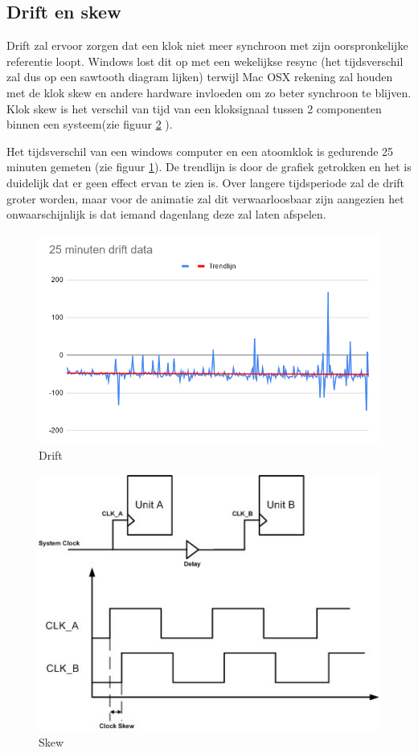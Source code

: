 \subsection{Drift en skew}

Drift zal ervoor zorgen dat een klok niet meer synchroon met zijn oorspronkelijke referentie loopt. Windows lost dit op met een wekelijkse resync (het tijdsverschil zal dus op een sawtooth diagram lijken) terwijl Mac OSX rekening zal houden met de klok skew en andere hardware invloeden om zo beter synchroon te blijven.
Klok skew is het verschil van tijd van een kloksignaal tussen 2 componenten binnen een systeem(zie figuur \ref{skew1} \cite{skew}).

Het tijdsverschil van een windows computer en een atoomklok is gedurende 25 minuten gemeten (zie figuur \ref{drift}). De trendlijn is door de grafiek getrokken en het is duidelijk dat er geen effect ervan te zien is. Over langere tijdsperiode zal de drift groter worden, maar voor de animatie zal dit verwaarloosbaar zijn aangezien het onwaarschijnlijk is dat iemand dagenlang deze zal laten afspelen.

\begin{figure}[H]
\centering
\includegraphics[scale=0.3]{img/drift.png}
\caption{Drift} \label{drift}
\end{figure}

\begin{figure}[H]
\centering
\includegraphics[scale=0.7]{img/skew.jpg}
\caption{Skew} \label{skew1}
\end{figure}


